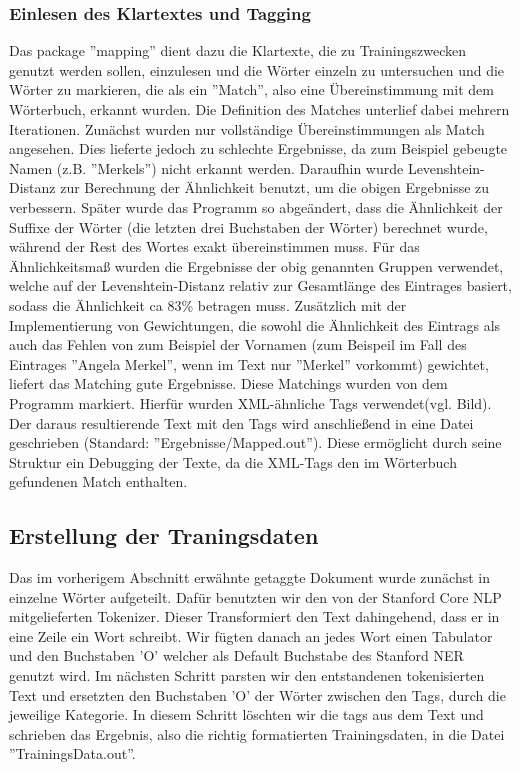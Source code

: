 \documentclass[a4paper]{article}
\begin{document}
\subsubsection{Einlesen des Klartextes und Tagging}
Das package ''mapping'' dient dazu die Klartexte, die zu Trainingszwecken genutzt werden sollen, einzulesen und die Wörter einzeln zu untersuchen und die Wörter zu markieren, die als ein ''Match'', also eine Übereinstimmung mit dem Wörterbuch, erkannt wurden.
Die Definition des Matches unterlief dabei mehrern Iterationen. Zunächst wurden nur vollständige Übereinstimmungen als Match angesehen.
Dies lieferte jedoch zu schlechte Ergebnisse, da zum Beispiel gebeugte Namen (z.B. ''Merkels'') nicht erkannt werden.
Daraufhin wurde Levenshtein-Distanz zur Berechnung der Ähnlichkeit benutzt, um die obigen Ergebnisse zu verbessern. Später wurde das Programm so abgeändert, dass die Ähnlichkeit der Suffixe der Wörter (die letzten drei Buchstaben der Wörter) berechnet wurde, während der Rest des Wortes exakt übereinstimmen muss. Für das Ähnlichkeitsmaß wurden die Ergebnisse der obig genannten Gruppen verwendet, welche auf der Levenshtein-Distanz relativ zur Gesamtlänge des Eintrages basiert, sodass die Ähnlichkeit ca 83\% betragen muss.
Zusätzlich mit der Implementierung von Gewichtungen, die sowohl die Ähnlichkeit des Eintrags als auch das Fehlen von zum Beispiel der Vornamen (zum Beispeil im Fall des Eintrages ''Angela Merkel'', wenn im Text nur ''Merkel'' vorkommt) gewichtet, liefert das Matching gute Ergebnisse. Diese Matchings wurden von dem Programm markiert. Hierfür wurden XML-ähnliche Tags verwendet(vgl. Bild).
Der daraus resultierende Text mit den Tags wird anschließend in eine Datei geschrieben (Standard: ''Ergebnisse/Mapped.out''). Diese ermöglicht durch seine Struktur ein Debugging der Texte, da die XML-Tags den im Wörterbuch gefundenen Match enthalten.

\subsection{Erstellung der Traningsdaten}
Das im vorherigem Abschnitt erwähnte getaggte Dokument wurde zunächst in einzelne Wörter aufgeteilt. Dafür benutzten wir den von der Stanford Core NLP mitgelieferten Tokenizer. Dieser Transformiert den Text dahingehend, dass er in eine Zeile ein Wort schreibt. Wir fügten danach an jedes Wort einen Tabulator und den Buchstaben 'O' welcher als Default Buchstabe des Stanford NER genutzt wird.
Im nächsten Schritt parsten wir den entstandenen tokenisierten Text und ersetzten den Buchstaben 'O' der Wörter zwischen den Tags, durch die jeweilige Kategorie. In diesem Schritt löschten wir die tags aus dem Text und schrieben das Ergebnis, also die richtig formatierten Trainingsdaten, in die Datei ''TrainingsData.out''.
\end{document}
